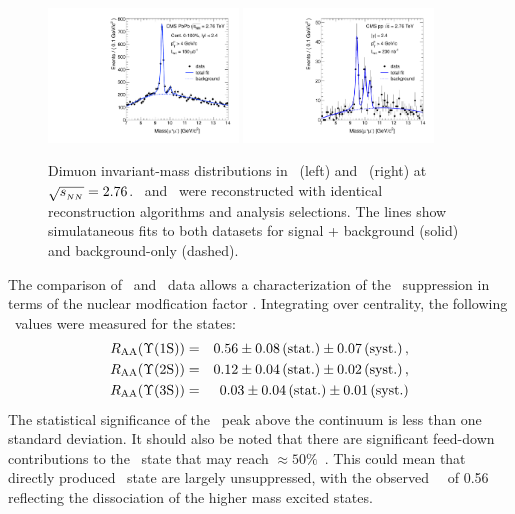\begin{figure}[t]
\begin{center}
    \includegraphics[width=0.45\textwidth]{qqbarfigures/hiFitPt4Erf}
    \includegraphics[width=0.45\textwidth]{qqbarfigures/ppFitPt4Erf}
    \caption{Dimuon invariant-mass distributions in \PbPb\ (left) and \pp\ (right)
at $\sqrt{s_{_{NN}}} = 2.76$\TeV. \PbPb\ and \pp\ were reconstructed with identical 
reconstruction algorithms and analysis selections. The lines show simulataneous fits to both 
datasets for signal + background (solid) and background-only (dashed).}
\label{fig:GR:mass}
\end{center}
\end{figure}

The comparison of \pp\ and \PbPb\ data allows a characterization of the \PgU\ suppression
in terms of the nuclear modfication factor \Raa.
Integrating over centrality, the following \Raa\ values were measured for the \PgUn states:
\begin{eqnarray}
R_\mathrm{AA} (\Upsilon\mathrm{(1S)}) &=& 0.56 \pm 0.08\,\mbox{(stat.)} \pm 0.07\,\mbox{(syst.)} \,, \\
R_\mathrm{AA} (\Upsilon\mathrm{(2S)}) &=& 0.12 \pm 0.04\,\mbox{(stat.)} \pm 0.02\,\mbox{(syst.)} \,, \nonumber \\
R_\mathrm{AA} (\Upsilon\mathrm{(3S)}) &=& 0.03 \pm 0.04\,\mbox{(stat.)} \pm 0.01\,\mbox{(syst.)}  \nonumber\\
\end{eqnarray}
The statistical significance of the \PgUc\ peak above the continuum is less than one standard deviation.
It should also be noted that there are significant feed-down contributions to
the \PgUa\ state that may reach $\approx 50\%$~\cite{Affolder:1999wm, Aaij:2012se}.
This could mean that directly produced \PgUa\ state are largely unsuppressed, with
the observed \PgUa\ \Raa\ of 0.56 reflecting the dissociation of the higher mass excited states.

